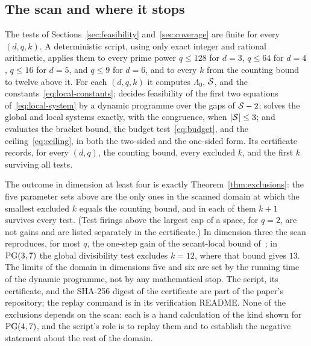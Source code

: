 \subsection{The scan and where it stops}

The tests of Sections~\ref{sec:feasibility} and~\ref{sec:coverage} are
finite for every \((d,q,k)\).  A deterministic script, using only exact
integer and rational arithmetic, applies them to every prime power
\(q\le128\) for \(d=3\), \(q\le64\) for \(d=4\), \(q\le16\) for \(d=5\),
and \(q\le9\) for \(d=6\), and to every \(k\) from the counting bound to
twelve above it.  For each \((d,q,k)\) it computes \(\Lambda_0\),
\(\mathcal S\), and the constants~\eqref{eq:local-constants}; decides
feasibility of the first two equations of~\eqref{eq:local-system} by a
dynamic programme over the gaps of \(\mathcal S-2\); solves the global and local
systems exactly, with the congruence, when \(|\mathcal S|\le3\); and evaluates
the bracket bound, the budget test~\eqref{eq:budget}, and the
ceiling~\eqref{eq:ceiling}, in both the two-sided and the one-sided
form.  Its certificate records, for every \((d,q)\), the counting bound,
every excluded \(k\), and the first \(k\) surviving all tests.

The outcome in dimension at least four is exactly
Theorem~\ref{thm:exclusions}: the five parameter sets above are the only
ones in the scanned domain at which the smallest excluded \(k\) equals the
counting bound, and in each of them \(k+1\) survives every test.  (Test
firings above the largest cap of a space, for \(q=2\), are not gains and
are listed separately in the certificate.)  In dimension three the scan
reproduces, for most \(q\), the one-step gain of the secant-local bound
of~\cite[Section~5]{RuddSecantDefects}; in \(\mathrm{PG}(3,7)\) the global
divisibility test excludes \(k=12\), where that bound gives \(13\).  The
limits of the domain in dimensions five and six are set by the running
time of the dynamic programme, not by any mathematical stop.  The script,
its certificate, and the SHA-256 digest of the certificate are part of
the paper's repository; the replay command is in its verification
README.  None of the exclusions depends on the scan: each is a hand
calculation of the kind shown for \(\mathrm{PG}(4,7)\), and the script's role is
to replay them and to establish the negative statement about the rest of
the domain.
